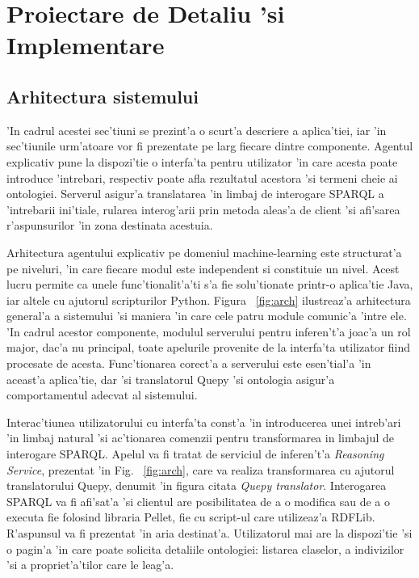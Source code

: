 \documentclass[12pt,a4paper,twoside]{report}
\begin{document}
\chapter{Proiectare de Detaliu 'si Implementare}
\label{sec:proiectare}

\section{Arhitectura sistemului}

'In cadrul acestei sec'tiuni se prezint'a o scurt'a descriere a aplica'tiei, iar 'in sec'tiunile urm'atoare vor fi prezentate pe larg fiecare dintre componente. Agentul explicativ pune la dispozi'tie o interfa'ta pentru utilizator 'in care acesta poate introduce 'intrebari, respectiv poate afla rezultatul acestora 'si termeni cheie ai ontologiei. Serverul asigur'a translatarea 'in limbaj de interogare SPARQL a 'intrebarii ini'tiale, rularea interog'arii prin metoda aleas'a de client 'si afi'sarea r'aspunsurilor 'in zona destinata acestuia.

Arhitectura agentului explicativ pe domeniul machine-learning este structurat'a pe niveluri, 'in care fiecare modul este independent si constituie un nivel. Acest lucru permite ca unele func'tionalit'a'ti s'a fie solu'tionate printr-o aplica'tie Java, iar altele cu ajutorul scripturilor Python. Figura ~\ref{fig:arch} ilustreaz'a arhitectura general'a a sistemului 'si maniera 'in care cele patru module comunic'a 'intre ele. 'In cadrul acestor componente, modulul serverului pentru inferen't'a joac'a un rol major, dac'a nu principal, toate apelurile provenite de la interfa'ta utilizator fiind procesate de acesta. Func'tionarea corect'a a serverului este esen'tial'a 'in aceast'a aplica'tie, dar 'si translatorul Quepy 'si ontologia asigur'a comportamentul adecvat al sistemului.

Interac'tiunea utilizatorului cu interfa'ta const'a 'in introducerea unei intreb'ari 'in limbaj natural 'si ac'tionarea comenzii pentru transformarea in limbajul de interogare SPARQL. Apelul va fi tratat de serviciul de inferen't'a {\it Reasoning Service}, prezentat 'in Fig. ~\ref{fig:arch}, care va realiza transformarea cu ajutorul translatorului Quepy, denumit 'in figura citata {\it Quepy translator}. Interogarea SPARQL va fi afi'sat'a 'si clientul are posibilitatea de a o modifica sau de a o executa fie folosind libraria Pellet, fie cu script-ul care utilizeaz'a RDFLib. R'aspunsul va fi prezentat 'in aria destinat'a. Utilizatorul mai are la dispozi'tie 'si o pagin'a 'in care poate solicita detaliile ontologiei: listarea claselor, a indivizilor 'si a propriet'a'tilor care le leag'a.
\end{document}
